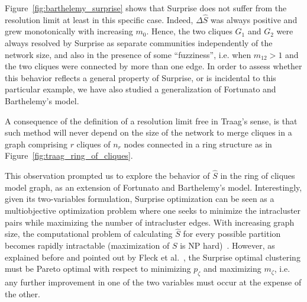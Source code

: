 Figure~\ref{fig:barthelemy_surprise} shows that Surprise does not suffer from the resolution limit at least in this specific case.
Indeed, $\Delta \hat{S}$ was always positive and grew monotonically with increasing $m_0$. 
Hence, the two cliques $G_1$ and $G_2$ were always resolved by Surprise as separate communities independently of the network size, and also in the presence of some ``fuzziness'', i.e. when $m_{12}>1$ and the two cliques were connected by more than one edge.
In order to assess whether this behavior reflects a general property of Surprise, or is incidental to this particular example, we have also studied a generalization of Fortunato and Barthelemy's model.

A consequence of the definition of a resolution limit free in Traag's sense, is that such method will never depend on the size of the network to merge cliques in a graph comprising $r$ cliques of $n_r$ nodes connected in a ring structure as in Figure~\ref{fig:traag_ring_of_cliques}.

This observation prompted us to explore the behavior of $\hat{S}$ in the ring of cliques model graph, as an extension of Fortunato and Barthelemy's model.
Interestingly, given its two-variables formulation, Surprise optimization can be seen as a multiobjective optimization problem where one seeks to minimize the intracluster pairs while maximizing the number of intracluster edges.
With increasing graph size, the computational problem of calculating $\hat{S}$ for every possible partition becomes rapidly intractable (maximization of $S$ is NP hard)~\cite{fleck2014}.
However, as explained before and pointed out by Fleck et al.~\cite{fleck2014}, the Surprise optimal clustering must be Pareto optimal with respect to minimizing $p_\zeta$ and maximizing $m_\zeta$, i.e. any further improvement in one of the two variables must occur at the expense of the other.

